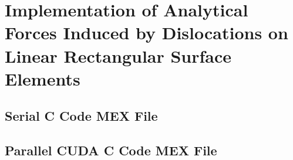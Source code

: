 \chapter{Implementation of Analytical Forces Induced by Dislocations on Linear Rectangular Surface Elements}
	\section{Serial C Code MEX File}
	\section{Parallel CUDA C Code MEX File}
\savearabiccounter
		